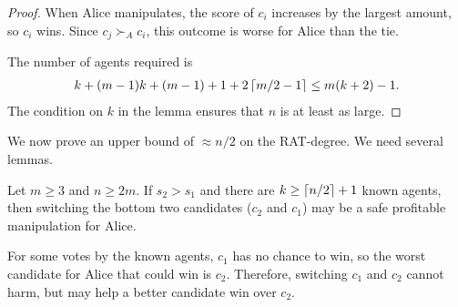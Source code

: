 \begin{proof}
When Alice manipulates, the score of $c_i$ increases by the largest amount, so $c_i$ wins. Since $c_j \succ_A c_i$, this outcome is worse for Alice than the tie.

The number of agents required is 
\begin{align*}
k + (m-1)k + (m-1) + 1 + 2\left\lceil m/2-1 \right\rceil
\leq 
m (k+2) - 1.
\end{align*}
The condition on $k$ in the lemma ensures that $n$ is at least as large.
\end{proof}


We now prove an upper bound of $\approx n/2$ on the RAT-degree. We need several lemmas.



\begin{lemmarep}
\label{lem:s2>s1}
Let $m\geq 3$ and $n\geq 2m$.
If $s_2 > s_1$
and there are $k\geq \left\lceil n/2 \right\rceil+1$ known agents,
then
switching the bottom two candidates ($c_2$ and $c_1$) may be a safe profitable manipulation for Alice.
\end{lemmarep}
\begin{proofsketch}
For some votes by the known agents,
$c_1$ has no chance to win, so the worst candidate for Alice that could win is $c_2$. Therefore, switching $c_1$ and $c_2$ cannot harm, but may help a better candidate win over $c_2$.
\end{proofsketch}

